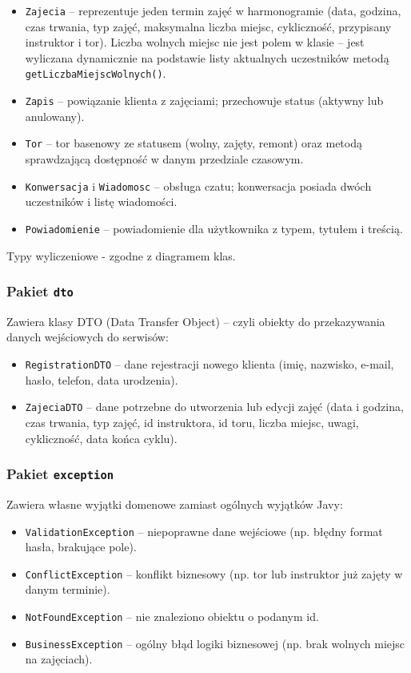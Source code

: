 \documentclass[a4paper,12pt]{article}
\begin{document}
\begin{itemize}
    \item \texttt{Zajecia} -- reprezentuje jeden termin zajęć w harmonogramie (data, godzina, czas trwania, typ zajęć, maksymalna liczba miejsc, cykliczność, przypisany instruktor i tor). Liczba wolnych miejsc nie jest polem w klasie -- jest wyliczana dynamicznie na podstawie listy aktualnych uczestników metodą \texttt{getLiczbaMiejscWolnych()}.
    \item \texttt{Zapis} -- powiązanie klienta z zajęciami; przechowuje status (aktywny lub anulowany).
    \item \texttt{Tor} -- tor basenowy ze statusem (wolny, zajęty, remont) oraz metodą sprawdzającą dostępność w danym przedziale czasowym.
    \item \texttt{Konwersacja} i \texttt{Wiadomosc} -- obsługa czatu; konwersacja posiada dwóch uczestników i listę wiadomości.
    \item \texttt{Powiadomienie} -- powiadomienie dla użytkownika z typem, tytułem i treścią.
\end{itemize}

Typy wyliczeniowe - zgodne z diagramem klas.

\subsubsection*{Pakiet \texttt{dto}}

Zawiera klasy DTO (Data Transfer Object) -- czyli obiekty do przekazywania danych wejściowych do serwisów:

\begin{itemize}
    \item \texttt{RegistrationDTO} -- dane rejestracji nowego klienta (imię, nazwisko, e-mail, hasło, telefon, data urodzenia).
    \item \texttt{ZajeciaDTO} -- dane potrzebne do utworzenia lub edycji zajęć (data i godzina, czas trwania, typ zajęć, id instruktora, id toru, liczba miejsc, uwagi, cykliczność, data końca cyklu).
\end{itemize}

\subsubsection*{Pakiet \texttt{exception}}

Zawiera własne wyjątki domenowe zamiast ogólnych wyjątków Javy:

\begin{itemize}
    \item \texttt{ValidationException} -- niepoprawne dane wejściowe (np. błędny format hasła, brakujące pole).
    \item \texttt{ConflictException} -- konflikt biznesowy (np. tor lub instruktor już zajęty w danym terminie).
    \item \texttt{NotFoundException} -- nie znaleziono obiektu o podanym id.
    \item \texttt{BusinessException} -- ogólny błąd logiki biznesowej (np. brak wolnych miejsc na zajęciach).
\end{itemize}
\end{document}
